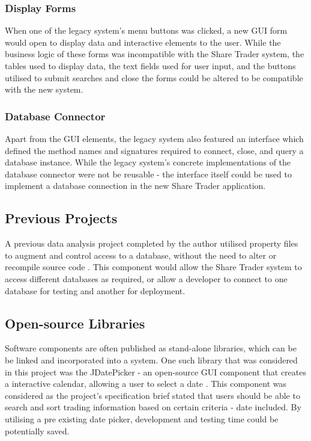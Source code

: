 \documentclass[12pt, a4paper,titlepage]{article}
\begin{document}
\subsubsection{Display Forms}
When one of the legacy system’s menu buttons was clicked, a new GUI form would
open to display data and interactive elements to the user.  
While the business logic of these forms was incompatible with the Share
Trader system, the tables used to display data, the text fields used for user
input, and the buttons utilised to submit searches and close the forms could
be altered to be compatible with the new system.

\subsubsection{Database Connector}
Apart from the GUI elements, the legacy system also featured an interface
which defined the method names and signatures required to connect, close, and
query a database instance. 
While the legacy system’s concrete implementations of the database connector
were not be reusable - the interface itself could be used to implement a 
database connection in the new Share Trader application.

\subsection{Previous Projects}
A previous data analysis project completed by the author utilised property
files to augment and control access to a database, without the need to alter
or recompile source code \cite{Dixon2017}.  
This component would allow the Share Trader system
to access different databases as required, or allow a developer to connect to
one database for testing and another for deployment.

\subsection{Open-source Libraries}
Software components are often published as stand-alone libraries, which can be
be linked and incorporated into a system. 
One such library that was considered in this project was the JDatePicker - an
open-source GUI component that creates a interactive calendar, allowing a user
to select a date \cite{Jdate}. 
This component was considered as the project's specification brief stated that
users should be able to search and sort trading information based on certain
criteria - date included. 
By utilising a pre existing date picker, development and testing time could be
potentially saved.
\end{document}
